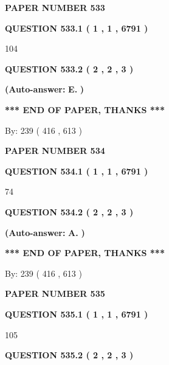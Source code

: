 \documentclass[12pt]{article}
\begin{document}
   
\newpage 
\setcounter{page}{ 
   533001 } 
   
   
 {\textbf{ \Large{ PAPER NUMBER  533  }}}
   
   
   
   
  
  
{\textbf{\large{QUESTION
533.1 
 ( 1 , 1 , 6791 )
}}}

104
  
  
{\textbf{\large{QUESTION
533.2 
 ( 2 , 2 , 3 )
}}}
 
 
{\textbf{(Auto-answer:}}
{\textbf{\large{
E.}}}
{\textbf{)}}
 
 
   
   
   
   
\vspace{1.0in} 
{\textbf{\large{ *** END OF PAPER, THANKS *** }}} 
   
   
\hspace{1.0in} By: 
 239 ( 416 ,  613 )
   
   
   
   
\newpage 
\setcounter{page}{ 
   534001 } 
   
   
 {\textbf{ \Large{ PAPER NUMBER  534  }}}
   
   
   
   
  
  
{\textbf{\large{QUESTION
534.1 
 ( 1 , 1 , 6791 )
}}}

74
  
  
{\textbf{\large{QUESTION
534.2 
 ( 2 , 2 , 3 )
}}}
 
 
{\textbf{(Auto-answer:}}
{\textbf{\large{
A.}}}
{\textbf{)}}
 
 
   
   
   
   
\vspace{1.0in} 
{\textbf{\large{ *** END OF PAPER, THANKS *** }}} 
   
   
\hspace{1.0in} By: 
 239 ( 416 ,  613 )
   
   
   
   
\newpage 
\setcounter{page}{ 
   535001 } 
   
   
 {\textbf{ \Large{ PAPER NUMBER  535  }}}
   
   
   
   
  
  
{\textbf{\large{QUESTION
535.1 
 ( 1 , 1 , 6791 )
}}}

105
  
  
{\textbf{\large{QUESTION
535.2 
 ( 2 , 2 , 3 )
}}}
 
\end{document}
